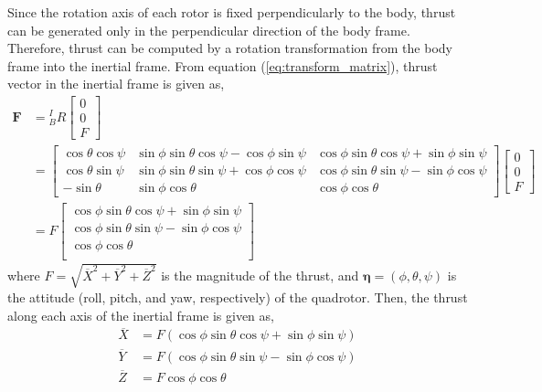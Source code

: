 Since the rotation axis of each rotor is fixed perpendicularly to the body, thrust can be generated only in the perpendicular direction of the body frame. Therefore, thrust can be computed by a rotation transformation from the body frame into the inertial frame. From equation (\ref{eq:transform_matrix}), thrust vector in the inertial frame is given as,
\begin{equation}
\begin{aligned}
{\boldsymbol F}
& = {^I_B}{R} 
\begin{bmatrix}
0\\
0\\
F
\end{bmatrix}\\
& =
\begin{bmatrix}
\cos{\theta} \cos{\psi} & \sin{\phi} \sin{\theta} \cos{\psi} - \cos{\phi}\sin{\psi} & \cos{\phi} \sin{\theta} \cos{\psi} + \sin{\phi} \sin{\psi}\\
\cos{\theta} \sin{\psi} & \sin{\phi} \sin{\theta} \sin{\psi} + \cos{\phi}\cos{\psi} & \cos{\phi} \sin{\theta} \sin{\psi} - \sin{\phi} \cos{\psi}\\
-\sin{\theta} &  \sin{\phi} \cos{\theta} & \cos{\phi} \cos{\theta}
\end{bmatrix}
\begin{bmatrix}
0\\
0\\
F
\end{bmatrix}\\
& =
F
\begin{bmatrix}
\cos{\phi} \sin{\theta} \cos{\psi} + \sin{\phi} \sin{\psi}\\
\cos{\phi} \sin{\theta} \sin{\psi} - \sin{\phi} \cos{\psi}\\
\cos{\phi} \cos{\theta}\\
\end{bmatrix}
\end{aligned}
\end{equation}
where \( F = \sqrt{{\overline{X}}^2 + {\overline{Y}}^2 + {\overline{Z}}^2}\) is the magnitude of the thrust, and \( {\boldsymbol \eta} = (\phi, \theta, \psi) \) is the attitude (roll, pitch, and yaw, respectively) of the quadrotor. Then, the thrust along each axis of the inertial frame is given as,
\begin{equation}
\label{eq:thrust_vector}
\begin{aligned}
{\overline X} &=  F (\cos{\phi} \sin{\theta} \cos{\psi} + \sin{\phi} \sin{\psi})\\
{\overline Y} &= F (\cos{\phi} \sin{\theta} \sin{\psi} - \sin{\phi} \cos{\psi})\\
{\overline Z} &=  F \cos{\phi} \cos{\theta}\\
\end{aligned}
\end{equation}
